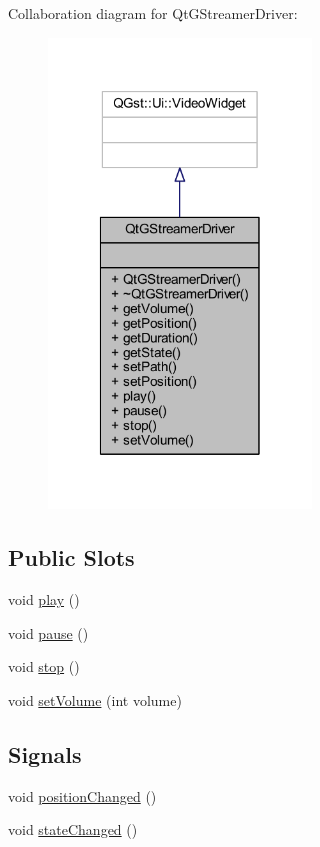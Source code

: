 Collaboration diagram for Qt\-G\-Streamer\-Driver\-:
\nopagebreak
\begin{figure}[H]
\begin{center}
\leavevmode
\includegraphics[width=198pt]{class_qt_g_streamer_driver__coll__graph}
\end{center}
\end{figure}
\subsection*{Public Slots}
\begin{DoxyCompactItemize}
\item 
void \hyperlink{class_qt_g_streamer_driver_a1da349939a8952bef19caa3dc1398793}{play} ()
\item 
void \hyperlink{class_qt_g_streamer_driver_a989eef1d9bf2d0686d1c46240b159197}{pause} ()
\item 
void \hyperlink{class_qt_g_streamer_driver_afdc955e0b961bc7731bc0018ac147107}{stop} ()
\item 
void \hyperlink{class_qt_g_streamer_driver_a9a12e01f670bb3df69e5fc7547365be7}{set\-Volume} (int volume)
\end{DoxyCompactItemize}
\subsection*{Signals}
\begin{DoxyCompactItemize}
\item 
void \hyperlink{class_qt_g_streamer_driver_a923a5a22f33296d53115ad54b9ed80e6}{position\-Changed} ()
\item 
void \hyperlink{class_qt_g_streamer_driver_ae6739c0a756de50aa2e2b5a6984fb378}{state\-Changed} ()
\end{DoxyCompactItemize}
